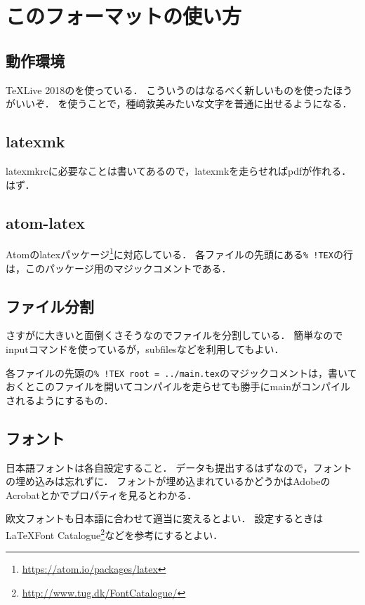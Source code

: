 \section{このフォーマットの使い方}
\label{sec:02-hoge}

\subsection{動作環境}

\TeX{}Live 2018の\upLaTeX{}を使っている．
こういうのはなるべく新しいものを使ったほうがいいぞ．
\upLaTeX{}を使うことで，種﨑敦美みたいな文字を普通に出せるようになる．

\subsection{latexmk}

latexmkrcに必要なことは書いてあるので，latexmkを走らせればpdfが作れる．はず．

\subsection{atom-latex}

Atomのlatexパッケージ\footnote{\url{https://atom.io/packages/latex}}に対応している．
各ファイルの先頭にある\verb|% !TEX|の行は，このパッケージ用のマジックコメントである．

\subsection{ファイル分割}

さすがに大きいと面倒くさそうなのでファイルを分割している．
簡単なのでinputコマンドを使っているが，subfilesなどを利用してもよい．

各ファイルの先頭の\verb|% !TEX root = ../main.tex|のマジックコメントは，書いておくとこのファイルを開いてコンパイルを走らせても勝手にmainがコンパイルされるようにするもの．

\subsection{フォント}
\label{ssec:02-hoge-font}

日本語フォントは各自設定すること．
データも提出するはずなので，フォントの埋め込みは忘れずに．
フォントが埋め込まれているかどうかはAdobeのAcrobatとかでプロパティを見るとわかる．

欧文フォントも日本語に合わせて適当に変えるとよい．
設定するときは\LaTeX Font Catalogue\footnote{\url{http://www.tug.dk/FontCatalogue/}}などを参考にするとよい．

